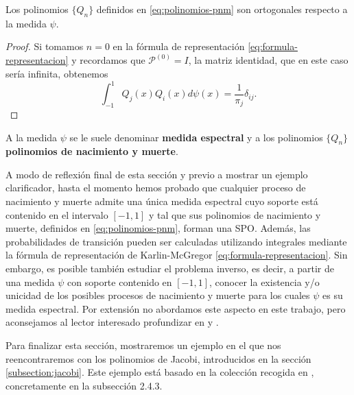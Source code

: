     \begin{corolario}
        Los polinomios $\{Q_n\}$ definidos en \eqref{eq:polinomios-pnm} son ortogonales respecto a la medida $\psi$.
    \end{corolario}
    \begin{proof}
        Si tomamos $n=0$ en la fórmula de representación \eqref{eq:formula-representacion} y recordamos que $\mathcal{P}^{(0)}=I$, la matriz identidad, que en este caso sería infinita, obtenemos
        $$
        \int_{-1}^1 Q_j(x)Q_i(x)d\psi(x) = \frac{1}{\pi_j}\delta_{ij}.
        $$
    \end{proof}

    A la medida $\psi$ se le suele denominar \textbf{medida espectral} y a los polinomios $\{Q_n\}$ \textbf{polinomios de nacimiento y muerte}. 

    A modo de reflexión final de esta sección y previo a mostrar un ejemplo clarificador, hasta el momento hemos probado que cualquier proceso de nacimiento y muerte admite una única medida espectral cuyo soporte está contenido en el intervalo $[-1,1]$ y tal que sus polinomios de nacimiento y muerte, definidos en \eqref{eq:polinomios-pnm}, forman una SPO. Además, las probabilidades de transición pueden ser calculadas utilizando integrales mediante la fórmula de representación de Karlin-McGregor \eqref{eq:formula-representacion}. Sin embargo, es posible también estudiar el problema inverso, es decir, a partir de una medida $\psi$ con soporte contenido en $[-1,1]$, conocer la existencia y/o unicidad de los posibles procesos de nacimiento y muerte para los cuales $\psi$ es su medida espectral. Por extensión no abordamos este aspecto en este trabajo, pero aconsejamos al lector interesado profundizar en \cite[Section 2.2]{Manuel} y \cite{random-walks}.

    Para finalizar esta sección, mostraremos un ejemplo en el que nos reencontraremos con los polinomios de Jacobi, introducidos en la sección \ref{subsection:jacobi}. Este ejemplo está basado en la colección recogida en \cite[CH. II, Section 2.4]{Manuel}, concretamente en la subsección 2.4.3.


